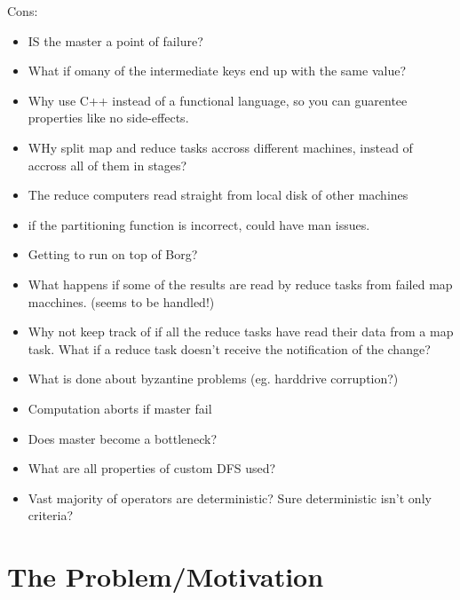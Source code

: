 \documentclass[11pt]{article}
\begin{document}
Cons:

\begin{itemize}

    \item IS the master a point of failure?

    \item What if omany of the intermediate keys end up with the same value?

    \item Why use C++ instead of a functional language, so you can guarentee properties like no side-effects.

    \item WHy split map and reduce tasks accross different machines, instead of accross all of them in stages?

    \item The reduce computers read straight from local disk of other machines

    \item if the partitioning function is incorrect, could have man issues.

    \item Getting to run on top of Borg?

    \item What happens if some of the results are read by reduce tasks from failed map macchines. (seems to be handled!)

    \item Why not keep track of if all the reduce tasks have read their data from a map task. What if a reduce task doesn't receive the notification of the change?

    \item What is done about byzantine problems (eg. harddrive corruption?)

    \item Computation aborts if master fail

    \item Does master become a bottleneck?

    \item What are all properties of custom DFS used?

    \item Vast majority of operators are deterministic? Sure deterministic isn't only criteria?

\end{itemize}

\section*{The Problem/Motivation}
\end{document}
